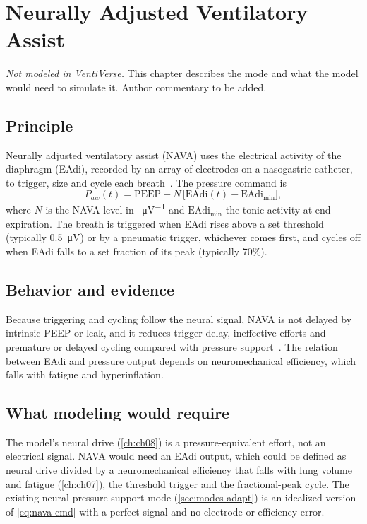 \chapter{Neurally Adjusted Ventilatory Assist}
\label{ch:nava}

\begin{authornote}
\emph{Not modeled in VentiVerse.} This chapter describes the mode and what the model would need to simulate it. Author commentary to be added.
\end{authornote}

\section{Principle}
Neurally adjusted ventilatory assist (NAVA) uses the electrical activity of the diaphragm (EAdi), recorded by an array of electrodes on a nasogastric catheter, to trigger, size and cycle each breath~\citep{sinderby1999}. The pressure command is
\begin{equation}
P_{aw}(t)=\mathrm{PEEP}+N\,\bigl[\mathrm{EAdi}(t)-\mathrm{EAdi}_{\min}\bigr],
\label{eq:nava-cmd}
\end{equation}
where $N$ is the NAVA level in \si{\cmH\per\micro\volt} and $\mathrm{EAdi}_{\min}$ the tonic activity at end-expiration. The breath is triggered when EAdi rises above a set threshold (typically \SI{0.5}{\micro\volt}) or by a pneumatic trigger, whichever comes first, and cycles off when EAdi falls to a set fraction of its peak (typically 70\%).

\section{Behavior and evidence}
Because triggering and cycling follow the neural signal, NAVA is not delayed by intrinsic PEEP or leak, and it reduces trigger delay, ineffective efforts and premature or delayed cycling compared with pressure support~\citep{piquilloud2011}. The relation between EAdi and pressure output depends on neuromechanical efficiency, which falls with fatigue and hyperinflation.

\section{What modeling would require}
The model's neural drive (\cref{ch:ch08}) is a pressure-equivalent effort, not an electrical signal. NAVA would need an EAdi output, which could be defined as neural drive divided by a neuromechanical efficiency that falls with lung volume and fatigue (\cref{ch:ch07}), the threshold trigger and the fractional-peak cycle. The existing neural pressure support mode (\cref{sec:modes-adapt}) is an idealized version of \cref{eq:nava-cmd} with a perfect signal and no electrode or efficiency error.
